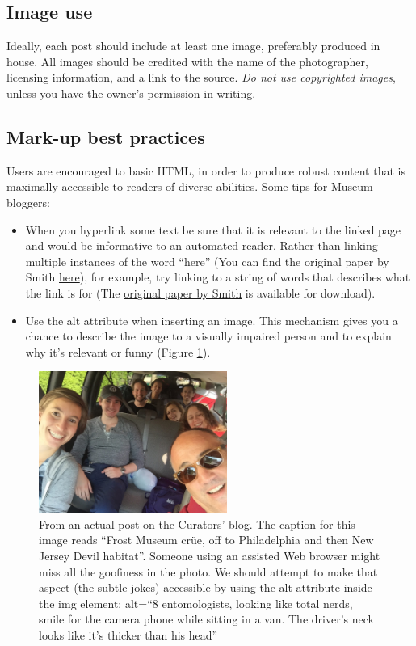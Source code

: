 \documentclass[letterpaper, 11pt]{article}
\begin{document}
\subsection{Image use}

Ideally, each post should include at least one image, preferably produced in house. All images should be credited with the name of the photographer, licensing information, and a link to the source. \textit{Do not use copyrighted images}, unless you have the owner's permission in writing. 

\subsection{Mark-up best practices}

Users are encouraged to basic HTML, in order to produce robust content that is maximally accessible to readers of diverse abilities. Some tips for Museum bloggers:
\begin{itemize}
\item When you hyperlink some text be sure that it is relevant to the linked page and would be informative to an automated reader. Rather than linking multiple instances of the word ``here'' (You can find the original paper by Smith \underline{here}), for example, try linking to a string of words that describes what the link is for (The \underline{original paper by Smith} is available for download). 
\item Use the alt attribute when inserting an image. This mechanism gives you a chance to describe the image to a visually impaired person and to explain why it's relevant or funny (Figure \ref{altImage}).
\end{itemize}

\begin{figure}[ht!]
	\centering
  \includegraphics[width=0.55\textwidth]{dorksInAVan}
  \caption{From an actual post on the Curators' blog. The caption for this image reads ``Frost Museum cr\"ue, off to Philadelphia and then New Jersey Devil habitat''. Someone using an assisted Web browser might miss all the goofiness in the photo. We should attempt to make that aspect (the subtle jokes) accessible by using the alt attribute inside the img element: \hfill{}alt=``8 entomologists, looking like total nerds, smile for the camera phone while sitting in a van. The driver's neck looks like it's thicker than his head''}
  \label{altImage}
\end{figure}
\end{document}
